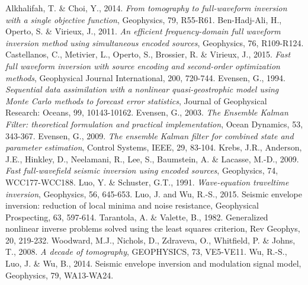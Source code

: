 \documentclass{gji}
\begin{document}
\begin{thebibliography}{}
   Alkhalifah, T. \& Choi, Y., 2014. \textit{From tomography to full-waveform inversion with a single objective function}, Geophysics, 79, R55-R61.
   Ben-Hadj-Ali, H., Operto, S. \& Virieux, J., 2011. \textit{An efficient frequency-domain full waveform inversion method using simultaneous encoded sources}, Geophysics, 76, R109-R124.
    Castellanos, C., Metivier, L., Operto, S., Brossier, R. \& Virieux, J., 2015. \textit{Fast full waveform inversion with source encoding and second-order optimization methods}, Geophysical Journal International, 200, 720-744. 
    Evensen, G., 1994. \textit{Sequential data assimilation with a nonlinear quasi-geostrophic model using Monte Carlo methods to forecast error statistics}, Journal of Geophysical Research: Oceans, 99, 10143-10162.
   Evensen, G., 2003. \textit{The Ensemble Kalman Filter: theoretical formulation and practical implementation}, Ocean Dynamics, 53, 343-367.
   Evensen, G., 2009. \textit{The ensemble Kalman filter for combined state and parameter estimation}, Control Systems, IEEE, 29, 83-104.
   Krebs, J.R., Anderson, J.E., Hinkley, D., Neelamani, R., Lee, S., Baumstein, A. \& Lacasse, M.-D., 2009. \textit{Fast full-wavefield seismic inversion using encoded sources}, Geophysics, 74, WCC177-WCC188.
   Luo, Y. \& Schuster, G.T., 1991. \textit{Wave-equation traveltime inversion}, Geophysics, 56, 645-653.
 Luo, J. and Wu, R.-S., 2015. Seismic envelope inversion: reduction of local minima and noise resistance, Geophysical Prospecting, 63, 597-614.
 Tarantola, A. \& Valette, B., 1982. Generalized nonlinear inverse problems solved using the least squares criterion, Rev Geophys, 20, 219-232.
 Woodward, M.J., Nichols, D., Zdraveva, O., Whitfield, P. \& Johns, T., 2008. \textit{A decade of tomography}, GEOPHYSICS, 73, VE5-VE11.
 Wu, R.-S., Luo, J. \& Wu, B., 2014. Seismic envelope inversion and modulation signal model, Geophysics, 79, WA13-WA24.

\end{thebibliography}
\end{document}
